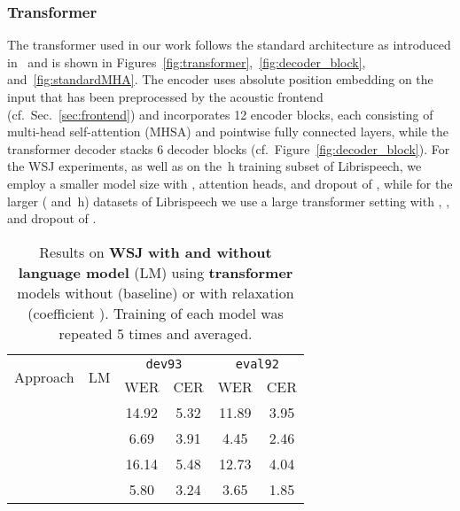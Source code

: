 \documentclass{article}
\begin{document}
\subsubsection{Transformer}\label{sec:exp_trans}	\vspace{-2.5mm}
The transformer used in our work follows the standard architecture as introduced in~\cite{Vaswani2017} and is shown in Figures~\ref{fig:transformer},~\ref{fig:decoder_block}, and~\ref{fig:standardMHA}. The encoder uses absolute position embedding on the input that has been preprocessed by the acoustic frontend (cf.\ Sec.~\ref{sec:frontend}) and incorporates 12 encoder blocks, each consisting of multi-head self-attention (MHSA) and pointwise fully connected layers, while the transformer decoder stacks 6 decoder blocks (cf.\ Figure~\ref{fig:decoder_block}). For the WSJ experiments, as well as on the \,h training subset of Librispeech, we employ a smaller model size with ,  attention heads, and dropout of , while for the larger ( and \,h) datasets of Librispeech we use a large transformer setting with , , and dropout of . 

\renewcommand{\tabcolsep}{0.2cm}
\begin{table}[t]
	\centering
	\begin{tabular}{@{\hskip 0.1cm} c @{\hskip 0.15cm} c c c c c @{\hskip 0.3cm}  }
		\toprule
		\multirow{2}[4]{*}{Approach} & \multirow{2}[4]{*}{LM} & \multicolumn{2}{c}{\multirow{1}{*}{\tt{dev93}}} & \multicolumn{2}{c}{\multirow{1}{*}{\tt{eval92}}} \\
		
		
		\cmidrule(lr){3-4} \cmidrule(lr){5-6} 
		& 				& WER 			& CER 			& WER 		& CER 			\\
		\midrule
		\multirow{2}[3]{*}{\sf{Baseline}}    		
		& 				& 14.92			& 5.32			& 11.89		& 3.95 \\
		&\checkmark		& 6.69 			& 3.91			& 4.45 		& 2.46 	 		\\
		\midrule
		\multirow{2}[3]{*}{\sf{Relaxed Attention}}			
		&		 		& 16.14			& 5.48 			& 12.73 		& 4.04 	 		\\
		&\checkmark	 	& 5.80 			& 3.24			& 3.65 			& 1.85	 		\\
		\bottomrule
	\end{tabular}	\vspace{-2mm}
	\caption{Results on \textbf{WSJ} \textbf{with and without language model} (LM) using \textbf{transformer} models without (baseline) or with relaxation (coefficient ). Training of each model was repeated 5 times and averaged.  }
	\label{tab:wsj_nolm}
	\vspace{-4mm}
\end{table}
\vspace{-3mm}
\end{document}
